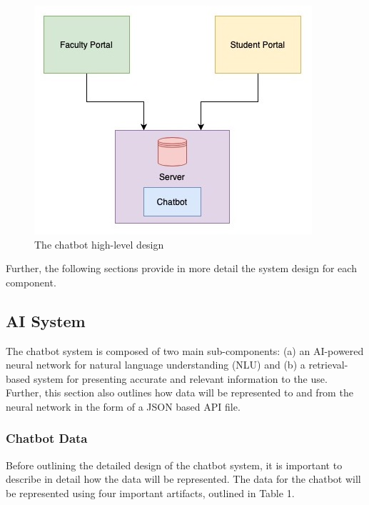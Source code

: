 \documentclass[titlepage, 12pt]{article}
\begin{document}
\pagebreak

\begin{figure}[h]
    \centering\includegraphics[width=0.5\linewidth]{images/high-level-design.jpg}
    \caption{The chatbot high-level design}
\end{figure}

Further, the following sections provide in more detail the system design for each component.

\subsection{AI System}

The chatbot system is composed of two main sub-components: (a) an AI-powered neural network for natural language understanding (NLU) and (b) a retrieval-based system for presenting accurate and relevant information to the use. Further, this section also outlines how data will be represented to and from the neural network in the form of a JSON based API file.

\subsubsection{Chatbot Data}

Before outlining the detailed design of the chatbot system, it is important to describe in detail how the data will be represented. The data for the chatbot will be represented using four important artifacts, outlined in Table 1.
\end{document}
